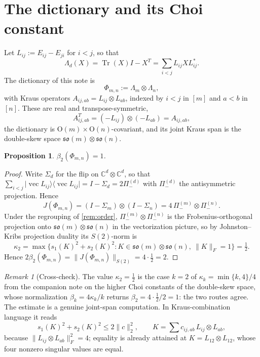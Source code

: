 \documentclass[11pt,reqno]{amsart}
\theoremstyle{plain}
\newtheorem{proposition}[theorem]{Proposition}
\theoremstyle{remark}
\newtheorem{remark}[theorem]{Remark}
\DeclareMathOperator{\Tr}{Tr}
\DeclareMathOperator{\vecop}{vec}
\newcommand{\ketbra}[2]{\lvert #1\rangle\!\langle #2\rvert}
\newcommand{\norm}[1]{\lVert #1\rVert}
\newcommand{\C}{\mathbb C}
\begin{document}
\section{The dictionary and its Choi constant}

Let $L_{ij}:=E_{ij}-E_{ji}$ for $i<j$, so that
\begin{equation}
\label{eq:Lam-kraus}
    \Lambda_d(X)=\Tr(X)I-X^T=\sum_{i<j}L_{ij}XL_{ij}^* .
\end{equation}
The dictionary of this note is
\begin{equation}
\label{eq:Phi}
    \Phi_{m,n}:=\Lambda_m\otimes\Lambda_n ,
\end{equation}
with Kraus operators $A_{ij,ab}=L_{ij}\otimes L_{ab}$, indexed by $i<j$ in
$[m]$ and $a<b$ in $[n]$.  These are real and transpose-symmetric,
\begin{equation}
\label{eq:sym}
    A_{ij,ab}^T=(-L_{ij})\otimes(-L_{ab})=A_{ij,ab},
\end{equation}
the dictionary is $\mathrm O(m)\times\mathrm O(n)$-covariant, and its joint
Kraus span is the double-skew space
$\mathfrak{so}(m)\otimes\mathfrak{so}(n)$.

\begin{proposition}
\label{prop:beta2}
$\beta_2(\Phi_{m,n})=1$.
\end{proposition}

\begin{proof}
Write $\Sigma_d$ for the flip on $\C^d\otimes\C^d$, so that
$\sum_{i<j}\ketbra{\vecop L_{ij}}{\vecop L_{ij}}=I-\Sigma_d=2\Pi_-^{(d)}$ with
$\Pi_-^{(d)}$ the antisymmetric projection.  Hence
\begin{equation}
\label{eq:J}
    J(\Phi_{m,n})
    =(I-\Sigma_m)\otimes(I-\Sigma_n)
    =4\,\Pi_-^{(m)}\otimes\Pi_-^{(n)} .
\end{equation}
Under the regrouping of \cref{rem:order},
$\Pi_-^{(m)}\otimes\Pi_-^{(n)}$ is the Frobenius-orthogonal projection onto
$\mathfrak{so}(m)\otimes\mathfrak{so}(n)$ in the vectorization picture, so by
Johnston--Kribs projection duality \cite{JohnstonKribs2010} its $S(2)$-norm is
\[
    \kappa_2
    =\max\bigl\{s_1(K)^2+s_2(K)^2:
      K\in\mathfrak{so}(m)\otimes\mathfrak{so}(n),\ \norm K_F=1\bigr\}
    =\tfrac12 .
\]
Hence $2\beta_2(\Phi_{m,n})=\norm{J(\Phi_{m,n})}_{S(2)}=4\cdot\frac12=2$.
\end{proof}

\begin{remark}[Cross-check]
\label{rem:crosscheck}
The value $\kappa_2=\frac12$ is the case $k=2$ of $\kappa_k=\min\{k,4\}/4$ from
the companion note on the higher Choi constants of the double-skew space, whose
normalization $\beta_k=4\kappa_k/k$ returns $\beta_2=4\cdot\frac12/2=1$: the two
routes agree.  The estimate is a genuine joint-span computation.  In
Kraus-combination language it reads
\[
    s_1(K)^2+s_2(K)^2\le2\norm c_2^2,
    \qquad
    K=\sum c_{ij,ab}\,L_{ij}\otimes L_{ab},
\]
because $\norm{L_{ij}\otimes L_{ab}}_F^2=4$; equality is already attained at
$K=L_{12}\otimes L_{12}$, whose four nonzero singular values are equal.
\end{remark}
\end{document}
